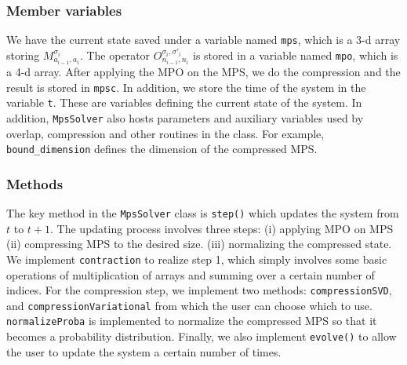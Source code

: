 \documentclass[english]{article}
\begin{document}
\subsubsection{Member variables}
We have the current state saved under a variable named \texttt{mps}, which is a 3-d array storing $M^{\sigma_i}_{a_{i-1},a_i}$. The operator $O^{\sigma_i, \sigma'_i}_{n_{i-1}, n_i}$ is stored in a variable named \texttt{mpo}, which is a 4-d array. After applying the MPO on the MPS, we do the compression and the result is stored in \texttt{mpsc}. In addition, we store the time of the system in the variable \texttt{t}. These are variables defining the current state of the system. In addition, \texttt{MpsSolver} also hosts parameters and auxiliary variables used by overlap, compression and other routines in the class. For example, \texttt{bound\_dimension} defines the dimension of the compressed MPS.
\subsubsection{Methods}
The key method in the \texttt{MpsSolver} class is \texttt{step()} which updates the system from $t$ to $t+1$. The updating process involves three steps: (i) applying MPO on MPS (ii) compressing MPS to the desired size. (iii) normalizing the compressed state. We implement \texttt{contraction} to realize step 1, which simply involves some basic operations of multiplication of arrays and summing over a certain number of indices. For the compression step, we implement two methods: \texttt{compressionSVD}, and \texttt{compressionVariational} from which the user can choose which to use. \texttt{normalizeProba} is implemented to normalize the compressed MPS so that it becomes a probability distribution. Finally, we also implement \texttt{evolve()} to allow the user to update the system a certain number of times.
\end{document}
